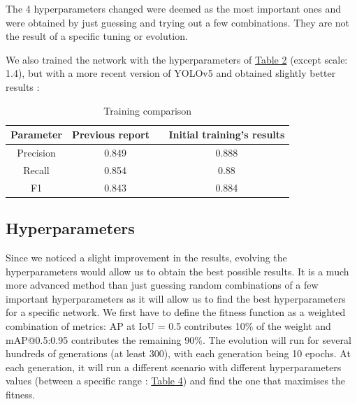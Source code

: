 \documentclass{article}
\begin{document}
The 4 hyperparameters changed were deemed as the most important ones and were obtained by just guessing and trying out a few combinations. They are not the result of a specific tuning or evolution.

\bigskip

We also trained the network with the hyperparameters of \hyperref[Table 2]{Table 2} (except scale: 1.4), but with a more recent version of YOLOv5 and obtained slightly better results :

\bigskip

\begin{table}[h!]
\centering
\begin{tabular}{|c|c|c|} 
 \hline
 Parameter &  Previous report ~\cite{stefano} & Initial training's results \\ [0.5ex] 
 \hline\hline
 Precision & 0.849 & 0.888 \\ 
 Recall & 0.854 & 0.88 \\
 F1 & 0.843 & 0.884 \\

 \hline
\end{tabular}
\caption{Training comparison}
\label{Table 3}
\end{table}

\subsection{Hyperparameters}

Since we noticed a slight improvement in the results, evolving the hyperparameters would allow us to obtain the best possible results. It is a much more advanced method than just guessing random combinations of a few important hyperparameters as it will allow us to find the best hyperparameters for a specific network. We first have to define the fitness function as a weighted combination of metrics: AP at IoU = 0.5 contributes 10\% of the weight and mAP@0.5:0.95 contributes the remaining 90\%. The evolution will run for several hundreds of generations (at least 300), with each generation being 10 epochs. At each generation, it will run a different scenario with different hyperparameters values (between a specific range : \hyperref[Table 4]{Table 4}) and find the one that maximises the fitness.

\bigskip
 
\end{document}
